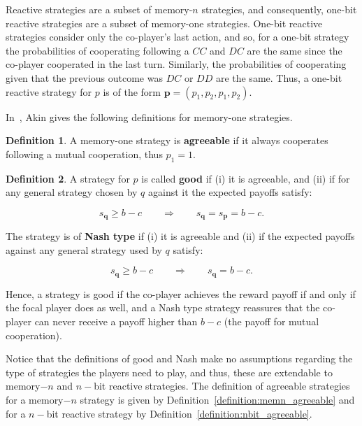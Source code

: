 \documentclass{article}
\theoremstyle{definition}
\newtheorem{definition}{Definition}[section]
\begin{document}
Reactive strategies are a subset of memory-\(n\)
strategies, and consequently, one-bit reactive strategies are a subset of
memory-one strategies. One-bit reactive strategies consider only the co-player's
last action, and so, for a one-bit strategy the probabilities of cooperating
following a \(CC\) and \(DC\) are the same since the co-player cooperated in the
last turn. Similarly, the probabilities of cooperating given that the previous
outcome was \(DC\) or \(DD\) are the same. Thus, a one-bit reactive strategy for \(p\)
is of the form \(\mathbf{p} = (p_1, p_2, p_1, p_2)\).

In~\citep{akin:EGADS:2016}, Akin gives the following definitions for memory-one
strategies.

\begin{definition}
A memory-one strategy is \textbf{agreeable} if it always cooperates following a mutual cooperation,
thus \(p_1=1\).
\end{definition}

\begin{definition}
  A strategy for \(p\) is called \textbf{good} if (i) it is agreeable,
  and (ii) if for any general strategy chosen by \(q\) against it the expected
  payoffs satisfy:
  
  \begin{equation}
    s_{\mathbf{q}} \geq b\!-\!c \qquad \Rightarrow \qquad s_{\mathbf{q}} = s_{\mathbf{p}} =  b\!-\!c.
  \end{equation}

  The strategy is of \textbf{Nash type} if (i) it is agreeable and (ii) if the
  expected payoffs against any general strategy used by \(q\) satisfy:

  \begin{equation}
    s_{\mathbf{q}} \geq b\!-\!c \qquad \Rightarrow \qquad s_{\mathbf{q}} =  b\!-\!c.
  \end{equation}
\end{definition}

Hence, a strategy is good if the co-player achieves the reward payoff if and
only if the focal player does as well, and a Nash type strategy reassures that the
co-player can never receive a payoff higher than \(b\!-\!c\) (the payoff for mutual
cooperation).

Notice that the definitions of good and Nash make no assumptions regarding the
type of strategies the players need to play, and thus, these are extendable to
memory\(-n\) and \(n-\)bit reactive strategies. The definition of agreeable
strategies for a memory\(-n\) strategy is given by
Definition~\ref{definition:memn_agreeable} and for a \(n-\)bit reactive
strategy by Definition~\ref{definition:nbit_agreeable}.
\end{document}
